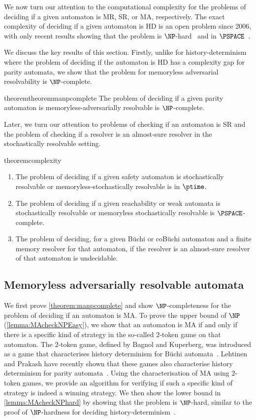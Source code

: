 We now turn our attention to the computational complexity for the problems of deciding if a given automaton is MR, SR, or MA, respectively. The exact complexity of deciding if a given automaton is HD is an open problem since 2006, with only recent results showing that the problem is $\NP$-hard~\cite{Pra24a} and in $\PSPACE$~\cite{LP25}. 

We discuss the key results of this section. Firstly, unlike for history-determinism where the problem of deciding if the automaton is HD has a  complexity gap for parity automata, we show that the problem for memoryless adversarial resolvability is $\NP$-complete.
\begin{restatable}{theorem}{theoremmanpcomplete}\label{theorem:manpcomplete}
    The problem of deciding if a given parity automaton is memoryless-adversarially resolvable is $\NP$-complete. 
\end{restatable}
Later, we turn our attention to problems of checking if an automaton is SR and the problem of checking if a resolver is an almost-sure resolver in the stochastically resolvable setting. 
\begin{restatable}{theorem}{complexity}\label{theorem:complexity}
\begin{enumerate}
    \item The problem of deciding if a given safety automaton is stochastically resolvable or memory\-less-stochastically  resolvable is in $\ptime$.
    \item The problem of deciding if a given reachability or weak automata is stochastically resolvable or memoryless stochastically resolvable is $\PSPACE$-complete.
    \item The problem of deciding, for a given B\"uchi or coB\"uchi automaton and a finite memory resolver for that automaton, if the resolver is an almost-sure resolver of that automaton is undecidable.
\end{enumerate}
\end{restatable}
\subsection{Memoryless adversarially resolvable automata}
We first prove \cref{theorem:manpcomplete} and show $\NP$-completeness for the problem of deciding if an automaton is MA. To prove the upper bound of $\NP$ (\cref{lemma:MAcheckNPEasy}), we show that an automaton is MA if and only if there is a specific kind of strategy in the so-called $2$-token game on that automaton. 
The $2$-token game, defined by Bagnol and Kuperberg, was introduced as a game that characterises history determinism for B\"uchi automata~\cite{BK18}. Lehtinen and Prakash have recently shown that these games also characterise history determinism for parity automata~\cite{LP25}. Using the characterisation of MA using $2$-token games, we provide an algorithm for verifying if such a specific kind of strategy is indeed a winning strategy. We then show the lower bound in \cref{lemma:MAcheckNPhard} by showing that the problem is $\NP$-hard, similar to the proof of $\NP$-hardness for deciding history-determinism~\cite{Pra24a}. 

